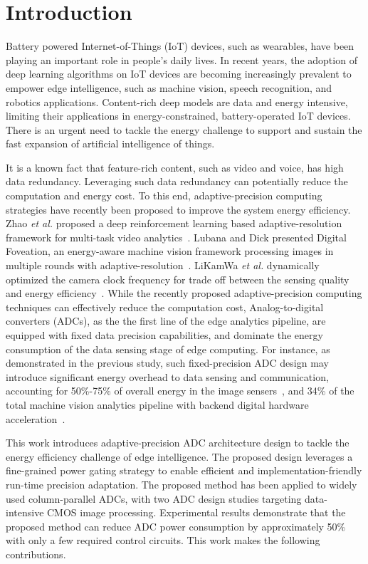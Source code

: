 \section{Introduction}

Battery powered Internet-of-Things (IoT) devices, such as wearables, have been playing an important role in people's daily lives.
In recent years, the adoption of deep learning algorithms on IoT devices are becoming increasingly prevalent to empower edge
intelligence, such as machine vision, speech recognition, and robotics applications. Content-rich deep models are data and energy 
intensive, limiting their applications in energy-constrained, battery-operated IoT devices. There is an urgent need to tackle the 
energy challenge to support and sustain the fast expansion of artificial intelligence of things.

It is a known fact that feature-rich content, such as video and voice, has high data redundancy. Leveraging such data redundancy
can potentially reduce the computation and energy cost. To this end, adaptive-precision computing strategies have recently been 
proposed to improve the system energy efficiency. Zhao {\it et al.} proposed a deep reinforcement learning based adaptive-resolution 
framework for multi-task video analytics~\cite{zhao_reinforcement-learning-based_2022}. Lubana and Dick presented Digital Foveation, an energy-aware machine vision framework processing images in multiple rounds with adaptive-resolution~\cite{lubana_digital_2018}. LiKamWa {\it et al.} dynamically optimized the camera clock frequency for trade off between the sensing quality and energy efficiency~\cite{likamwa_energy_2013}.
While the recently proposed adaptive-precision computing techniques can effectively reduce the computation cost, Analog-to-digital 
converters (ADCs), as the the first line of the edge analytics pipeline, are equipped with fixed data precision capabilities, and
dominate the energy consumption of the data sensing stage of edge computing. For instance, as demonstrated in the previous study, 
such fixed-precision ADC design may introduce significant energy overhead to data sensing and communication, accounting for 50\%-75\% of overall energy in the image sensers~\cite{choi_energyillumination-adaptive_2015,takayanagi_125-inch_2005,kitamura_33-megapixel_2012}, and 34\% 
of the total machine vision analytics pipeline with backend digital hardware acceleration~\cite{likamwa_redeye_2016}.

This work introduces adaptive-precision ADC architecture design to tackle the energy efficiency challenge of edge intelligence. 
The proposed design leverages a fine-grained power gating strategy to enable efficient and implementation-friendly run-time precision 
adaptation. The proposed method has been applied to widely used column-parallel ADCs, with two ADC design studies targeting 
data-intensive CMOS image processing. Experimental results demonstrate that the proposed method can reduce ADC power consumption 
by approximately 50\% with only a few required control circuits. This work makes the following contributions. 

